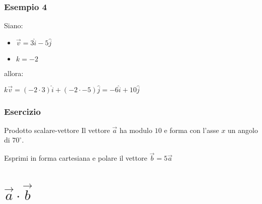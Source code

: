 \documentclass[]{beamer}
\theoremstyle{plain}
\begin{document}
\begin{frame}
  \frametitle{Esempio 4}


Siano:
\begin{itemize}
  \item $ \vec{v} = 3 \hat{i} - 5\hat{j} $
  \item $ k = -2 $
\end{itemize}
allora:
\begin{center}
$ k \vec{v}  = (-2\cdot 3)\hat{i} + (-2\cdot -5)\hat{j} = -6\hat{i} + 10\hat{j} $
\end{center}

\end{frame}



\begin{frame}
\frametitle{Esercizio}
\begin{exampleblock}{Prodotto scalare-vettore}
Il vettore $ \vec{a} $ ha modulo $ 10 $ e forma con l'asse $ x $ un angolo di $ 70^\circ $.

Esprimi in forma cartesiana e polare il vettore $ \vec{b} = 5\vec{a} $
\end{exampleblock} 
\end{frame}



\section{$ \vec{a}\cdot\vec{b} $}
\end{document}
